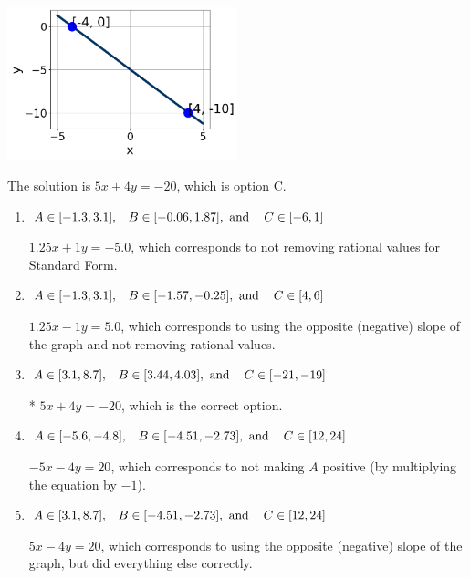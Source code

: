 \documentclass{extbook}[14pt]
\begin{document}
\begin{enumerate}
{\begin{center}
    \includegraphics[width=0.5\textwidth]{../Figures/linearGraphToStandardCopyA.png}
\end{center}


The solution is \( 5x + 4y = -20 \), which is option C.\begin{enumerate}[label=\Alph*.]
\item \( A \in [-1.3, 3.1], \hspace{3mm} B \in [-0.06, 1.87], \text{ and } \hspace{3mm} C \in [-6, 1] \)

 $1.25x + 1y = -5.0$, which corresponds to not removing rational values for Standard Form.
\item \( A \in [-1.3, 3.1], \hspace{3mm} B \in [-1.57, -0.25], \text{ and } \hspace{3mm} C \in [4, 6] \)

 $1.25x - 1y = 5.0$, which corresponds to using the opposite (negative) slope of the graph and not removing rational values.
\item \( A \in [3.1, 8.7], \hspace{3mm} B \in [3.44, 4.03], \text{ and } \hspace{3mm} C \in [-21, -19] \)

* $5x + 4y = -20$, which is the correct option.
\item \( A \in [-5.6, -4.8], \hspace{3mm} B \in [-4.51, -2.73], \text{ and } \hspace{3mm} C \in [12, 24] \)

 $-5x - 4y = 20$, which corresponds to not making $A$ positive (by multiplying the equation by $-1$).
\item \( A \in [3.1, 8.7], \hspace{3mm} B \in [-4.51, -2.73], \text{ and } \hspace{3mm} C \in [12, 24] \)

 $5x - 4y = 20$, which corresponds to using the opposite (negative) slope of the graph, but did everything else correctly.
\end{enumerate}

}
\end{enumerate}
\end{document}

